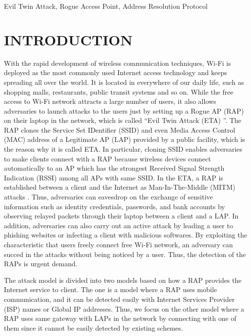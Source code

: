 \documentclass[conference]{IEEEtran}
\begin{document}
\begin{IEEEkeywords}
Evil Twin Attack, Rogue Access Point, Address Resolution Protocol
\end{IEEEkeywords}

\section{INTRODUCTION}
With the rapid development of wireless communication techniques, Wi-Fi is deployed as the most commonly used Internet access technology and keeps spreading all over the world\cite{bg-evi}.
It is located in everywhere of our daily life, such as shopping malls, restaurants, public transit systems and so on.
While the free access to Wi-Fi network attracts a large number of users, it also allows adversaries to launch attacks to the users just by setting up a Rogue AP (RAP) on their laptop in the network, which is called ``Evil Twin Attack (ETA) ''\cite{laptop-evi}.
The RAP clones the Service Set IDentifier (SSID) and even Media Access Control (MAC) address of a Legitimate AP (LAP) provided by a public facility, which is the reason why it is called ETA.
In particular, cloning SSID enables adversaries to make clients connect with a RAP because wireless devices connect automatically to an AP which has the strongest Received Signal Strength Indication (RSSI) among all APs with same SSID.
In the ETA, a RAP is established between a client and the Internet as Man-In-The-Middle (MITM) attacks \cite{spoof-evi}.
Thus, adversaries can eavesdrop on the exchange of sensitive information such as identity credentials, passwords, and bank accounts by observing relayed packets through their laptop between a client and a LAP.
In addition, adversaries can also carry out an active attack by leading a user to phishing websites or infecting a client with malicious softwares\cite{research}.
By exploiting the characteristic that users freely connect free Wi-Fi network,  an adversary can succed in the attacks without being noticed by a user.
Thus, the detection of the RAPs is urgent demand.

The attack model is divided into two models based on how a RAP provides the Internet service to client.
The one is a model where a RAP uses mobile communication, and it can be detected easily with Internet Services Provider (ISP) names or Global IP addresses\cite{rtt}.
Thus, we focus on the other model where a RAP uses same gateway with LAPs in the network by connecting with one of them since it cannot be easily detected by existing schemes.
\end{document}
